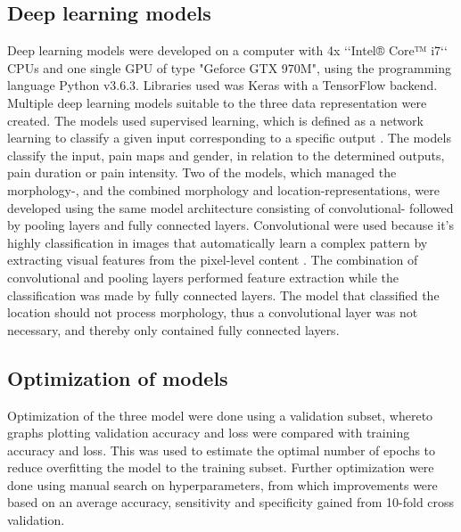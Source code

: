 \subsection*{\textbf{Deep learning models}}
\noindent
Deep learning models were developed on a computer with 4x ‘‘Intel® Core™ i7‘‘ CPUs and one single GPU of type "Geforce GTX 970M", using the programming language Python v3.6.3. Libraries used was Keras with a TensorFlow backend. \newline
\noindent
Multiple deep learning models suitable to the three data representation were created. The models used supervised learning, which is defined as a network learning to classify a given input corresponding to a specific output \citep{Goodfellow2016}. The models classify the input, pain maps and gender, in relation to the determined outputs, pain duration or pain intensity.\newline
\noindent
Two of the models, which managed the morphology-, and the combined morphology and location-representations, were developed using the same model architecture consisting of convolutional- followed by pooling layers and fully connected layers. Convolutional were used because it’s highly classification in images that automatically learn a complex pattern by extracting visual features from the pixel-level content \citep{Acquarelli2017,LeCun1998}. The combination of convolutional and pooling layers performed feature extraction while the classification was made by fully connected layers. \newline
\noindent
The model that classified the location should not process morphology, thus a convolutional layer was not necessary, and thereby only contained fully connected layers. 

\subsection*{\textbf{Optimization of models}}
\noindent
Optimization of the three model were done using a validation subset, whereto graphs plotting validation accuracy and loss were compared with training accuracy and loss. This was used to estimate the optimal number of epochs to reduce overfitting the model to the training subset. Further optimization were done using manual search on hyperparameters, from which improvements were based on an average accuracy, sensitivity and specificity gained from 10-fold cross validation.  





